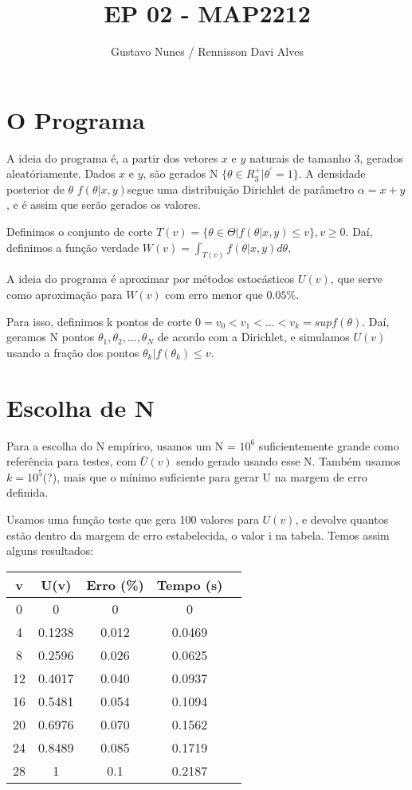 \documentclass{article}
\date{}
\title{\vspace{-2.0cm}EP 02 - MAP2212}
\author{Gustavo Nunes / Rennisson Davi Alves}
\begin{document}
		\maketitle
	
	\section{O Programa}
	A ideia do programa é, a partir dos vetores $x$ e $y$ naturais de tamanho 3, gerados aleatóriamente. Dados $x$ e $y$, são gerados N $\{\theta \in R_3^+ | \theta^{'}=1 \}$. A densidade posterior de $\theta$ $f(\theta|x, y)$segue uma distribuição Dirichlet de parâmetro $\alpha = x + y$, e é assim que serão gerados os valores. 
	
	Definimos o conjunto de corte $T(v) = \{\theta \in \Theta | f(\theta | x, y) \leq v\}, v\geq0$. Daí, definimos a função verdade $W(v) = \int_{T(v)}f(\theta|x, y)d\theta$. 
	
	A ideia do programa é aproximar por métodos estocásticos $U(v)$, que serve como aproximação para $W(v)$ com erro menor que $0.05\%$. 
	
	Para isso, definimos k pontos de corte $0 = v_0 < v_1 < ... < v_k = sup f(\theta)$. Daí, geramos N pontos $\theta_1, \theta_2, ..., \theta_N$ de acordo com a Dirichlet, e simulamos $U(v)$ usando a fração dos pontos $\theta_k | f(\theta_k)  \leq v $. 
	
	\section{Escolha de N}
	
	Para a escolha do N empírico, usamos um N = $10^{6}$ suficientemente grande como referência para testes, com $\bar{U}(v)$ sendo gerado usando esse N. Também usamos $k = 10^5$(?), mais que o mínimo suficiente para gerar U na margem de erro definida. 
	
	Usamos uma função teste que gera 100 valores para $U(v)$, e devolve quantos estão dentro da margem de erro estabelecida, o valor i na tabela. Temos assim alguns resultados: 
 
	\begin{table}[htbp]
		\begin{tabular}{|c|c|c|c|c|}
			v & U(v) & Erro (\%) & Tempo (s)\\
			\hline
			0 & 0 & 0 & 0\\	
			4 & 0.1238 & 0.012 & 0.0469\\
			8 & 0.2596 & 0.026 & 0.0625\\
                12 & 0.4017 & 0.040 & 0.0937\\
                16 & 0.5481 & 0.054 & 0.1094\\
                20 & 0.6976 & 0.070 & 0.1562\\
                24 & 0.8489 & 0.085 & 0.1719\\
                28 & 1 & 0.1 & 0.2187\\
		\end{tabular}
	\end{table}
 
\end{document}
